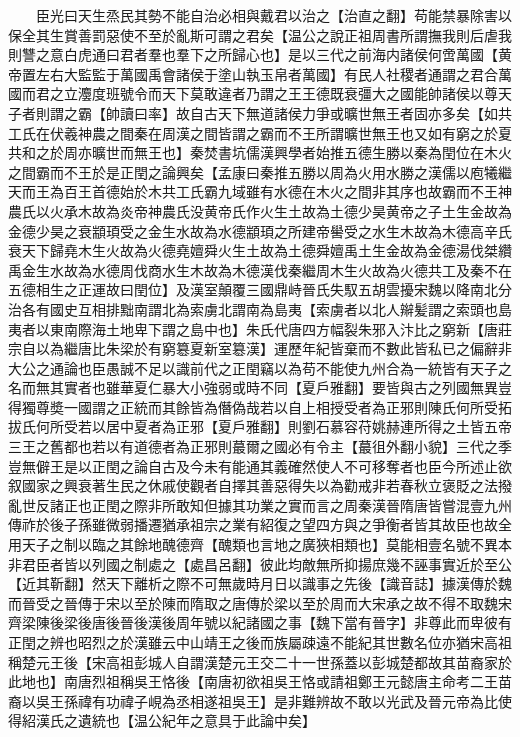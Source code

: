 　　臣光曰天生烝民其勢不能自治必相與戴君以治之【治直之翻】苟能禁暴除害以保全其生賞善罰惡使不至於亂斯可謂之君矣【温公之說正祖周書所謂撫我則后虐我則讐之意白虎通曰君者羣也羣下之所歸心也】是以三代之前海内諸侯何啻萬國【黄帝置左右大監監于萬國禹會諸侯于塗山執玉帛者萬國】有民人社稷者通謂之君合萬國而君之立灋度班號令而天下莫敢違者乃謂之王王德既衰彊大之國能帥諸侯以尊天子者則謂之霸【帥讀曰率】故自古天下無道諸侯力爭或曠世無王者固亦多矣【如共工氏在伏羲神農之間秦在周漢之間皆謂之霸而不王所謂曠世無王也又如有窮之於夏共和之於周亦曠世而無王也】秦焚書坑儒漢興學者始推五德生勝以秦為閏位在木火之間霸而不王於是正閏之論興矣【孟康曰秦推五勝以周為火用水勝之漢儒以庖犧繼天而王為百王首德始於木共工氏霸九域雖有水德在木火之間非其序也故霸而不王神農氏以火承木故為炎帝神農氏没黄帝氏作火生土故為土德少昊黄帝之子土生金故為金德少昊之衰顓頊受之金生水故為水德顓頊之所建帝嚳受之水生木故為木德高辛氏衰天下歸堯木生火故為火德堯嬗舜火生土故為土德舜嬗禹土生金故為金德湯伐桀纘禹金生水故為水德周伐商水生木故為木德漢伐秦繼周木生火故為火德共工及秦不在五德相生之正運故曰閏位】及漢室顛覆三國鼎峙晉氏失馭五胡雲擾宋魏以降南北分治各有國史互相排黜南謂北為索虜北謂南為島夷【索虜者以北人辮髪謂之索頭也島夷者以東南際海土地卑下謂之島中也】朱氏代唐四方幅裂朱邪入汴比之窮新【唐莊宗自以為繼唐比朱梁於有窮簒夏新室簒漢】運歷年紀皆棄而不數此皆私已之偏辭非大公之通論也臣愚誠不足以識前代之正閏竊以為苟不能使九州合為一統皆有天子之名而無其實者也雖華夏仁暴大小強弱或時不同【夏戶雅翻】要皆與古之列國無異豈得獨尊奬一國謂之正統而其餘皆為僭偽哉若以自上相授受者為正邪則陳氏何所受拓拔氏何所受若以居中夏者為正邪【夏戶雅翻】則劉石慕容苻姚赫連所得之土皆五帝三王之舊都也若以有道德者為正邪則蕞爾之國必有令主【蕞徂外翻小貌】三代之季豈無僻王是以正閏之論自古及今未有能通其義確然使人不可移奪者也臣今所述止欲叙國家之興衰著生民之休戚使觀者自擇其善惡得失以為勸戒非若春秋立褒貶之法撥亂世反諸正也正閏之際非所敢知但據其功業之實而言之周秦漢晉隋唐皆嘗混壹九州傳祚於後子孫雖微弱播遷猶承祖宗之業有紹復之望四方與之爭衡者皆其故臣也故全用天子之制以臨之其餘地醜德齊【醜類也言地之廣狹相類也】莫能相壹名號不異本非君臣者皆以列國之制處之【處昌呂翻】彼此均敵無所抑揚庶幾不誣事實近於至公【近其靳翻】然天下離析之際不可無歲時月日以識事之先後【識音誌】據漢傳於魏而晉受之晉傳于宋以至於陳而隋取之唐傳於梁以至於周而大宋承之故不得不取魏宋齊梁陳後梁後唐後晉後漢後周年號以紀諸國之事【魏下當有晉字】非尊此而卑彼有正閏之辨也昭烈之於漢雖云中山靖王之後而族屬疎遠不能紀其世數名位亦猶宋高祖稱楚元王後【宋高祖彭城人自謂漢楚元王交二十一世孫蓋以彭城楚都故其苗裔家於此地也】南唐烈祖稱吳王恪後【南唐初欲祖吳王恪或請祖鄭王元懿唐主命考二王苗裔以吳王孫禕有功禕子峴為丞相遂祖吳王】是非難辨故不敢以光武及晉元帝為比使得紹漢氏之遺統也【温公紀年之意具于此論中矣】

